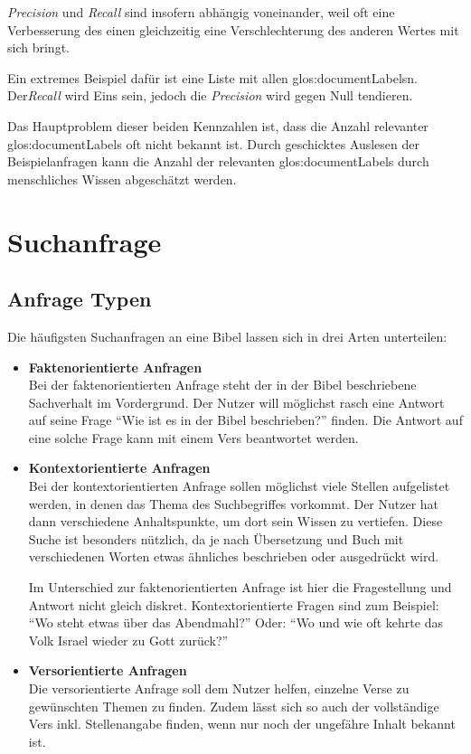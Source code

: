 \textit{Precision} und \textit{Recall} sind insofern abhängig voneinander, weil oft eine Verbesserung des einen gleichzeitig eine Verschlechterung des anderen Wertes mit sich bringt.

Ein extremes Beispiel dafür ist eine Liste mit allen \glspl{glos:documentLabel}n. Der\textit{Recall} wird Eins sein, jedoch die \textit{Precision} wird gegen Null tendieren.

Das Hauptproblem dieser beiden Kennzahlen ist, dass die Anzahl relevanter \glspl{glos:documentLabel} oft nicht bekannt ist. 
Durch geschicktes Auslesen der Beispielanfragen kann die Anzahl der relevanten \glspl{glos:documentLabel} durch menschliches Wissen abgeschätzt werden.



\section{Suchanfrage}

\subsection{Anfrage Typen}
Die häufigsten Suchanfragen an eine Bibel lassen sich in drei Arten unterteilen:
\begin{itemize}[noitemsep]
	\item \textbf{Faktenorientierte Anfragen}\\
		Bei der faktenorientierten Anfrage steht der in der Bibel beschriebene Sachverhalt im Vordergrund. Der Nutzer will möglichst rasch eine Antwort auf seine Frage "`Wie ist es in der Bibel beschrieben?"' finden.
		Die Antwort auf eine solche Frage kann mit einem Vers beantwortet werden.
		
	\item \textbf{Kontextorientierte Anfragen}\\
		Bei der kontextorientierten Anfrage sollen möglichst viele Stellen aufgelistet werden, in denen das Thema des Suchbegriffes vorkommt. Der Nutzer hat dann verschiedene Anhaltspunkte, um dort sein Wissen zu vertiefen.
		Diese Suche ist besonders nützlich, da je nach Übersetzung und Buch mit verschiedenen Worten etwas ähnliches beschrieben oder ausgedrückt wird.
		
		Im Unterschied zur faktenorientierten Anfrage ist hier die Fragestellung und Antwort nicht gleich diskret. Kontextorientierte Fragen sind zum Beispiel: "`Wo steht etwas über das Abendmahl?"' Oder: "`Wo und wie oft kehrte das Volk Israel wieder zu Gott zurück?"'
		
	\item \textbf{Versorientierte Anfragen}\\
		Die versorientierte Anfrage soll dem Nutzer helfen, einzelne Verse zu gewünschten Themen zu finden.
		Zudem lässt sich so auch der vollständige Vers inkl. Stellenangabe finden, wenn nur noch der ungefähre Inhalt bekannt ist.
		
\end{itemize}

